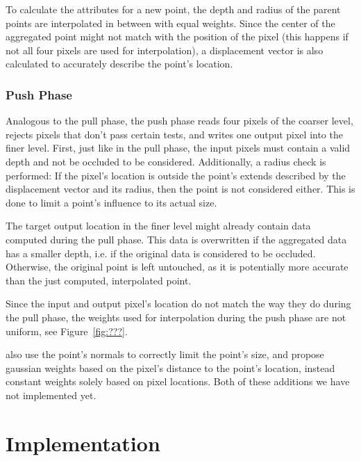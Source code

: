To calculate the attributes for a new point, the depth and radius of the parent points are interpolated in between with equal weights. Since the center of the aggregated point might not match with the position of the pixel (this happens if not all four pixels are used for interpolation), a displacement vector is also calculated to accurately describe the point's location.


\subsubsection{Push Phase}

Analogous to the pull phase, the push phase reads four pixels of the coarser level, rejects pixels that don't pass certain tests, and writes one output pixel into the finer level. First, just like in the pull phase, the input pixels must contain a valid depth and not be occluded to be considered. Additionally, a radius check is performed: If the pixel's location is outside the point's extends described by the displacement vector and its radius, then the point is not considered either. This is done to limit a point's influence to its actual size.

The target output location in the finer level might already contain data computed during the pull phase. This data is overwritten if the aggregated data has a smaller depth, i.e. if the original data is considered to be occluded. Otherwise, the original point is left untouched, as it is potentially more accurate than the just computed, interpolated point.

Since the input and output pixel's location do not match the way they do during the pull phase, the weights used for interpolation during the push phase are not uniform, see Figure~\ref{fig:???}.

 \cite{Marroquim:2007:reconstruction} also use the point's normals to correctly limit the point's size, and \cite{Marroquim:2008:reconstruction2} propose gaussian weights based on the pixel's distance to the point's location, instead constant weights solely based on pixel locations. Both of these additions we have not implemented yet.







 \section{Implementation}
 \label{sec:impl:ismRendering}

